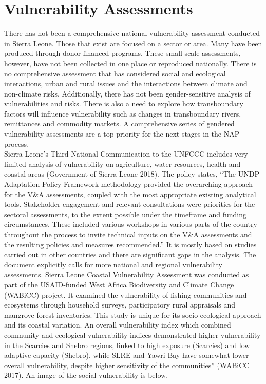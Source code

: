 \documentclass[
]{book}
\begin{document}
\hypertarget{vulnerability-assessments}{%
\section{Vulnerability Assessments}\label{vulnerability-assessments}}

There has not been a comprehensive national vulnerability assessment conducted in Sierra Leone. Those that exist are focused on a sector or area. Many have been produced through donor financed programs. These small-scale assessments, however, have not been collected in one place or reproduced nationally. There is no comprehensive assessment that has considered social and ecological interactions, urban and rural issues and the interactions between climate and non-climate risks. Additionally, there has not been gender-sensitive analysis of vulnerabilities and risks. There is also a need to explore how transboundary factors will influence vulnerability such as changes in transboundary rivers, remittances and commodity markets. A comprehensive series of gendered vulnerability assessments are a top priority for the next stages in the NAP process.\\
Sierra Leone's Third National Communication to the UNFCCC includes very limited analysis of vulnerability on agriculture, water resources, health and coastal areas (Government of Sierra Leone 2018). The policy states, ``The UNDP Adaptation Policy Framework methodology provided the overarching approach for the V\&A assessments, coupled with the most appropriate existing analytical tools. Stakeholder engagement and relevant consultations were priorities for the sectoral assessments, to the extent possible under the timeframe and funding circumstances. These included various workshops in various parts of the country throughout the process to invite technical inputs on the V\&A assessments and the resulting policies and measures recommended.'' It is mostly based on studies carried out in other countries and there are significant gaps in the analysis. The document explicitly calls for more national and regional vulnerability assessments.
Sierra Leone Coastal Vulnerability Assessment was conducted as part of the USAID‐funded West Africa Biodiversity and Climate Change (WABiCC) project. It examined the vulnerability of fishing communities and ecosystems through household surveys, participatory rural appraisals and mangrove forest inventories. This study is unique for its socio-ecological approach and its coastal variation. An overall vulnerability index which combined community and ecological vulnerability indices demonstrated higher vulnerability in the Scarcies and Shebro regions, linked to high exposure (Scarcies) and low adaptive capacity (Shebro), while SLRE and Yawri Bay have somewhat lower overall vulnerability, despite higher sensitivity of the communities'' (WABiCC 2017). An image of the social vulnerability is below.
\end{document}
